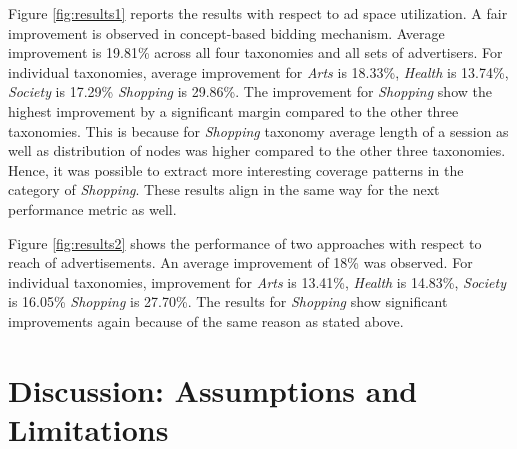 Figure \ref{fig:results1} reports the results with respect to ad space utilization. A fair improvement is observed in concept-based bidding mechanism. Average improvement is 19.81\% across all four taxonomies and all sets of advertisers. For individual taxonomies, average improvement for \textit{Arts} is 18.33\%, \textit{Health} is 13.74\%, \textit{Society} is 17.29\% \textit{Shopping} is 29.86\%. The improvement for \textit{Shopping} show the highest improvement by a significant margin compared to the other three taxonomies. This is because for \textit{Shopping} taxonomy average length of a session as well as distribution of nodes was higher compared to the other three taxonomies. Hence, it was possible to extract more interesting coverage patterns in the category of \textit{Shopping}. These results align in the same way for the next performance metric as well.



Figure \ref{fig:results2} shows the performance of two approaches with respect to reach of advertisements. An average improvement of 18\% was observed. For individual taxonomies, improvement for \textit{Arts} is 13.41\%, \textit{Health} is 14.83\%, \textit{Society} is 16.05\% \textit{Shopping} is 27.70\%. The results for \textit{Shopping} show significant improvements again because of the same reason as stated above.






\section{Discussion: Assumptions and Limitations}
\label{ch5Discussion}

